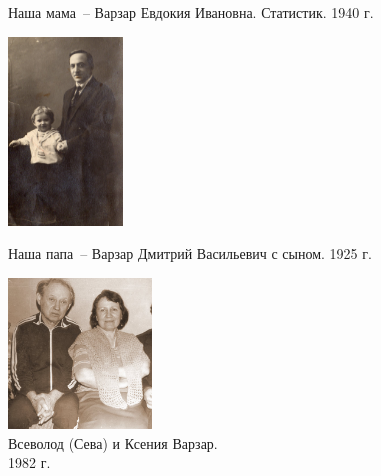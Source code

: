 \documentclass[utf8x, 12pt]{G7-32a} %
\begin{document}
\begin{figure}[h!]
\begin{minipage}[h]{55mm}
       \caption{Наша мама~-- Варзар Евдокия Ивановна. Статистик. 1940 г.}
   \end{minipage}
   \hfill
    \begin{minipage}[h!]{55mm}
        \begin{center}
        \includegraphics[height=50mm]{inc/Varzar/13.jpg}
        \end{center}
        \caption{Наша папа~-- Варзар Дмитрий Васильевич с сыном. 1925 г.}
    \end{minipage}
    \hfill
    \begin{minipage}[h!]{40mm}
         \vspace{10pt}
        \begin{center}
        \includegraphics[height=40mm]{inc/Varzar/14.jpg}
        \end{center}
        \vspace{-10pt}
        \caption{Всеволод (Сева) и Ксения Варзар. \\1982 г.}
    \end{minipage}
\end{figure}
\end{document}
